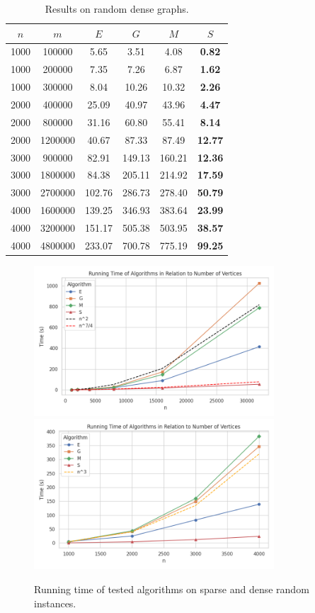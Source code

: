 \begin{table}
\centering
\begin{tabular}{
cc|cccc}
$n$ & $m$ & $E$ & $G$ & $M$ & $S$ \\
\hline
1000 & 100000 & 5.65 & 3.51 & 4.08 & \textbf{0.82} \\
1000 & 200000 & 7.35 & 7.26 & 6.87 & \textbf{1.62} \\
1000 & 300000 & 8.04 & 10.26 & 10.32 & \textbf{2.26} \\
2000 & 400000 & 25.09 & 40.97 & 43.96 & \textbf{4.47} \\
2000 & 800000 & 31.16 & 60.80 & 55.41 & \textbf{8.14} \\
2000 & 1200000 & 40.67 & 87.33 & 87.49 & \textbf{12.77} \\
3000 & 900000 & 82.91 & 149.13 & 160.21 & \textbf{12.36} \\
3000 & 1800000 & 84.38 & 205.11 & 214.92 & \textbf{17.59} \\
3000 & 2700000 & 102.76 & 286.73 & 278.40 & \textbf{50.79} \\
4000 & 1600000 & 139.25 & 346.93 & 383.64 & \textbf{23.99} \\
4000 & 3200000 & 151.17 & 505.38 & 503.95 & \textbf{38.57} \\
4000 & 4800000 & 233.07 & 700.78 & 775.19 & \textbf{99.25} \\
\end{tabular}
\caption{Results on random dense graphs.}\label{tab:dense}
\end{table}

\begin{figure}[b]
    \centering
    \includegraphics*[width=0.8\textwidth]{figures/sparse.png}
    \includegraphics*[width=0.8\textwidth]{figures/dense.png}
    \caption{Running time of tested algorithms on sparse and dense random instances.}\label{fig:sparse_dense}
\end{figure}

